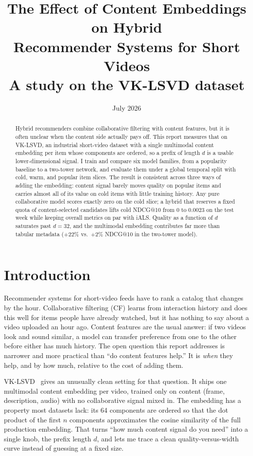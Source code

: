 \documentclass[11pt,a4paper]{article}
\title{\vspace{-1.2cm}\textbf{The Effect of Content Embeddings on Hybrid\\ Recommender Systems for Short Videos}\\[0.3em]
\large A study on the VK-LSVD dataset}
\author{}
\date{July 2026}
\begin{document}
\maketitle
\vspace{-1.0cm}

\begin{abstract}
\noindent
Hybrid recommenders combine collaborative filtering with content features, but it is
often unclear when the content side actually pays off. This report measures that on
VK-LSVD, an industrial short-video dataset with a single multimodal content embedding
per item whose components are ordered, so a prefix of length $d$ is a usable
lower-dimensional signal. I train and compare six model families, from a popularity
baseline to a two-tower network, and evaluate them under a global temporal split with
cold, warm, and popular item slices. The result is consistent across three ways of
adding the embedding: content signal barely moves quality on popular items and carries
almost all of its value on cold items with little training history. Any pure
collaborative model scores exactly zero on the cold slice; a hybrid that reserves a
fixed quota of content-selected candidates lifts cold NDCG@10 from $0$ to $0.0023$ on
the test week while keeping overall metrics on par with iALS. Quality as a function of
$d$ saturates past $d=32$, and the multimodal embedding contributes far more than
tabular metadata ($+22\%$ vs.\ $+2\%$ NDCG@10 in the two-tower model).
\end{abstract}

\section{Introduction}
Recommender systems for short-video feeds have to rank a catalog that changes by the
hour. Collaborative filtering (CF) learns from interaction history and does this well
for items people have already watched, but it has nothing to say about a video uploaded
an hour ago. Content features are the usual answer: if two videos look and sound
similar, a model can transfer preference from one to the other before either has much
history. The open question this report addresses is narrower and more practical than
``do content features help.'' It is \emph{when} they help, and by how much, relative to
the cost of adding them.

VK-LSVD~\cite{vklsvd} gives an unusually clean setting for that question. It ships one
multimodal content embedding per video, trained only on content (frame, description,
audio) with no collaborative signal mixed in. The embedding has a property most datasets
lack: its 64 components are ordered so that the dot product of the first $n$ components
approximates the cosine similarity of the full production embedding. That turns
``how much content signal do you need'' into a single knob, the prefix length $d$, and
lets me trace a clean quality-versus-width curve instead of guessing at a fixed size.
\end{document}
